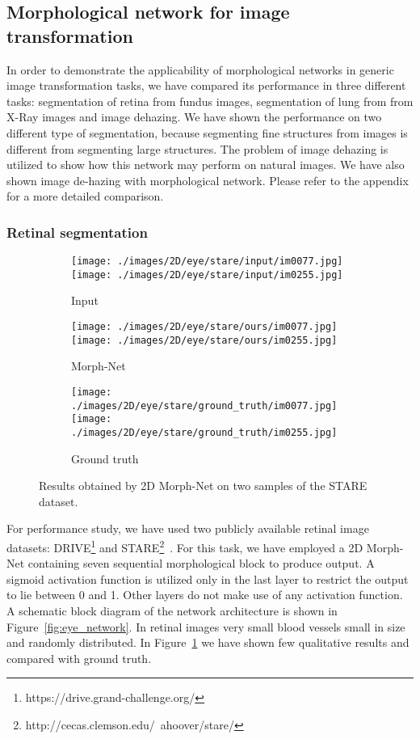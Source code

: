 \documentclass[12pt]{article}
\begin{document}
\subsection{Morphological network for image  transformation}
In order to demonstrate the applicability of morphological networks in generic image transformation tasks, we have compared its performance in three different tasks: segmentation of retina from fundus images, segmentation of lung from from X-Ray images and image dehazing. We have shown the performance on two different type of segmentation, because segmenting fine structures from images is different from segmenting large structures. The problem of image dehazing is utilized to show how this network may perform on natural images. We have also shown image de-hazing with morphological network. Please refer to the appendix for a more detailed comparison.

\subsubsection{Retinal segmentation}
\begin{figure}
    \centering
    \begin{subfigure}[t]{0.325\linewidth}
        \texttt{[image: ./images/2D/eye/stare/input/im0077.jpg]}
        \texttt{[image: ./images/2D/eye/stare/input/im0255.jpg]}
        \caption{Input}
    \end{subfigure}
    \begin{subfigure}[t]{0.325\linewidth}
        \texttt{[image: ./images/2D/eye/stare/ours/im0077.jpg]}
        \texttt{[image: ./images/2D/eye/stare/ours/im0255.jpg]}
        \caption{Morph-Net}
    \end{subfigure}
    \begin{subfigure}[t]{0.325\linewidth}
        \texttt{[image: ./images/2D/eye/stare/ground\_truth/im0077.jpg]}
        \texttt{[image: ./images/2D/eye/stare/ground\_truth/im0255.jpg]}
        \caption{Ground truth}
    \end{subfigure}
\caption{Results obtained by 2D Morph-Net on two samples of the STARE dataset.}
\label{qualstare}
\end{figure}

For performance study, we have used two publicly available retinal image datasets: DRIVE\footnote{https://drive.grand-challenge.org/} and STARE\footnote{http://cecas.clemson.edu/~ahoover/stare/}~\cite{hoover2000locating}. For this task, we have employed a 2D Morph-Net containing seven sequential morphological block to produce output.
A sigmoid activation function is utilized only in the last layer to restrict the output to lie between 0 and 1. Other layers do not make use of any activation function. A schematic block diagram of the network architecture is shown in Figure~\ref{fig:eye_network}. 
In retinal images  very small blood vessels small in size and randomly distributed.  In Figure~\ref{qualstare} we have shown few qualitative results and compared with ground truth.  
\end{document}
